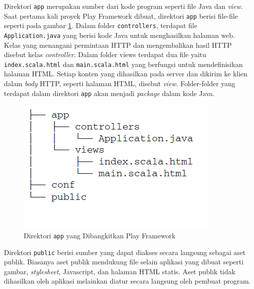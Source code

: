 Direktori \texttt{app} merupakan sumber dari kode program seperti file Java dan \textit{view}. Saat pertama kali proyek Play Framework dibuat, direktori \texttt{app} berisi file-file seperti pada gambar \ref{fig:2_app_dir}. Dalam folder \texttt{controllers}, terdapat file \texttt{Application.java} yang berisi kode Java untuk menghasilkan halaman web. Kelas yang menangani permintaan HTTP dan mengembalikan hasil HTTP disebut kelas \textit{controller}. Dalam folder views terdapat dua file yaitu \texttt{index.scala.html} dan \texttt{main.scala.html} yang berfungsi untuk mendefinisikan halaman HTML. Setiap konten yang dihasilkan pada server dan dikirim ke klien dalam \textit{body} HTTP, seperti halaman HTML, disebut \textit{view}. Folder-folder yang terdapat dalam direktori \texttt{app} akan menjadi \textit{package} dalam kode Java.
\begin{figure}[H]
	\centering
	\includegraphics[scale=0.5]{Gambar/app-dir}
	\caption{Direktori \texttt{app} yang Dibangkitkan Play Framework\cite{Leroux:2014}} 
	\label{fig:2_app_dir}
\end{figure}


Direktori \texttt{public} berisi sumber yang dapat diakses secara langsung sebagai aset publik. Biasanya aset publik mendukung file selain aplikasi yang dibuat seperti gambar, \textit{stylesheet}, Javascript, dan halaman HTML statis. Aset publik tidak dihasilkan oleh aplikasi melainkan diatur secara langsung oleh pembuat program.

